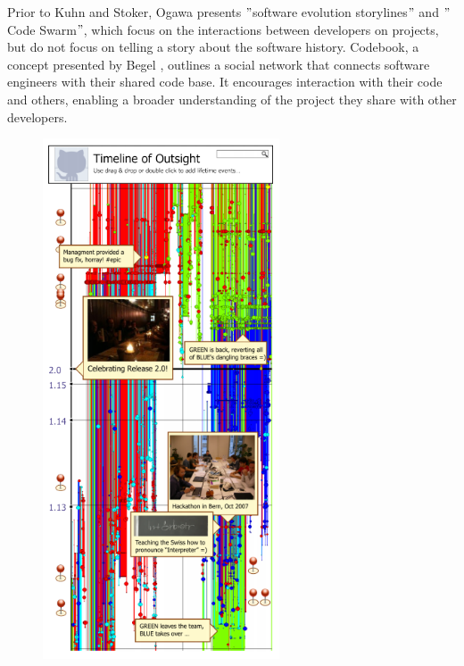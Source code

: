 \documentclass{egpubl}
\begin{document}
Prior to Kuhn and Stoker, Ogawa \cite{Ogawa,ogawa2009} presents $"$software evolution storylines$"$ and $"$Code Swarm$"$, which focus on the interactions between developers on projects, but do not focus on telling a story about the software history. Codebook, a concept presented by Begel \cite{begel2010}, outlines a social network that connects software engineers with their shared code base. It encourages interaction with their code and others, enabling a broader understanding of the project they share with other developers.
\begin{figure}
\begingroup
\centering
\includegraphics[width=7cm]{./images/kuhn2012}
\label{fig:kuhn2012}
\endgroup
\end{figure}
\end{document}
